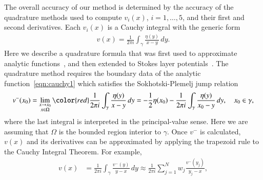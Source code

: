 \documentclass[3p]{elsarticle}
\newcommand{\edit}[1]{{\color{red} #1}}
\begin{document}
\begin{appendices}
\edit{The overall accuracy of our method is determined by the accuracy
of the quadrature methods used to compute $v_i(x)$, $i=1,\ldots,5$, and
their first and second derivatives. Each $v_i(x)$ is a Cauchy integral
with the generic form}
\begin{align}
  v(x) = \frac{1}{2\pi i} \int_{\gamma} \frac{\eta(y)}{x-y} \, dy.
  \label{eqn:cauchy1}
\end{align}
Here we describe a quadrature formula that was first used to approximate
analytic functions~\cite{ioa-pap-per1991}, and then extended to Stokes
layer potentials~\cite{bar-wu-vee2015}. The quadrature method requires
the boundary data of the analytic function~\eqref{eqn:cauchy1} which
satisfies the Sokhotski-Plemelj jump relation
\begin{align}
  v^{-}(x_0) = \lim_{\substack{x \rightarrow x_0 \\ x \in \Omega}} 
    \edit{\frac{1}{2\pi i}} \int_{\gamma}
    \frac{\eta(y)}{x-y}\, dy = -\frac{1}{2}\eta(x_0) - 
    \frac{1}{2\pi i} \int_{\gamma} \frac{\eta(y)}{x_0-y} \, dy,
    \quad x_0 \in \gamma,
    \label{eqn:SP}
\end{align}
where the last integral is interpreted in the principal-value sense.
Here we are assuming that $\Omega$ is the bounded region interior to
$\gamma$. Once $v^{-}$ is calculated, $v(x)$ and its derivatives 
\edit{can be approximated by applying the trapezoid rule to the Cauchy
Integral Theorem. For example,
\begin{align}
  v(x) &= \frac{1}{2\pi i}\int_{\gamma} \frac{v^{-}(y)}{y-x} \,dy \approx 
    \frac{1}{2\pi i} \sum_{j=1}^{N} w_j \frac{v^{-}(y_j)}{y_j - x},
  \label{eqn:cauchyv}

\end{align}}
\end{appendices}
\end{document}
